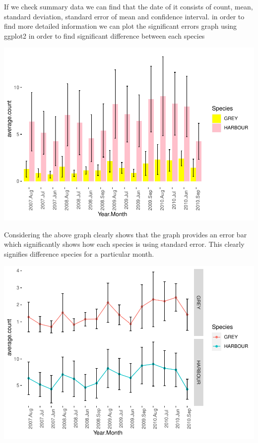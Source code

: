 \documentclass[
]{article}
\begin{document}
If we check summary data we can find that the date of it consists of
count, mean, standard deviation, standard error of mean and confidence
interval. in order to find more detailed information we can plot the
significant errors graph using ggplot2 in order to find significant
difference between each species

\includegraphics{Statistical-analysis-in-RStudio_files/figure-latex/unnamed-chunk-36-1.pdf}

Considering the above graph clearly shows that the graph provides an
error bar which significantly shows how each species is using standard
error. This clearly signifies difference species for a particular month.

\includegraphics{Statistical-analysis-in-RStudio_files/figure-latex/unnamed-chunk-37-1.pdf}
\end{document}
